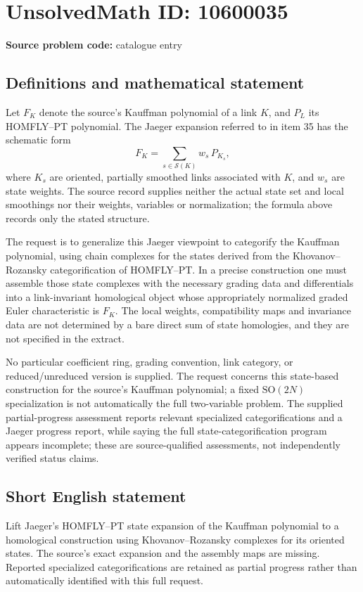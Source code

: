 \documentclass[11pt]{article}
\begin{document}
\section*{UnsolvedMath ID: 10600035}
\textbf{Source problem code:} catalogue entry
\subsection{Definitions and mathematical statement}
Let \(F_K\) denote the source's Kauffman polynomial of a link \(K\), and \(P_L\) its HOMFLY--PT polynomial. The Jaeger expansion referred to in item 35 has the schematic form
\[
 F_K=\sum_{s\in\mathcal S(K)}w_s\,P_{K_s},
\]
where \(K_s\) are oriented, partially smoothed links associated with \(K\), and \(w_s\) are state weights. The source record supplies neither the actual state set and local smoothings nor their weights, variables or normalization; the formula above records only the stated structure.

The request is to generalize this Jaeger viewpoint to categorify the Kauffman polynomial, using chain complexes for the states derived from the Khovanov--Rozansky categorification of HOMFLY--PT. In a precise construction one must assemble those state complexes with the necessary grading data and differentials into a link-invariant homological object whose appropriately normalized graded Euler characteristic is \(F_K\). The local weights, compatibility maps and invariance data are not determined by a bare direct sum of state homologies, and they are not specified in the extract.

No particular coefficient ring, grading convention, link category, or reduced/unreduced version is supplied. The request concerns this state-based construction for the source's Kauffman polynomial; a fixed \(\mathrm{SO}(2N)\) specialization is not automatically the full two-variable problem. The supplied partial-progress assessment reports relevant specialized categorifications and a Jaeger progress report, while saying the full state-categorification program appears incomplete; these are source-qualified assessments, not independently verified status claims.
\subsection{Short English statement}
Lift Jaeger's HOMFLY--PT state expansion of the Kauffman polynomial to a homological construction using Khovanov--Rozansky complexes for its oriented states. The source's exact expansion and the assembly maps are missing. Reported specialized categorifications are retained as partial progress rather than automatically identified with this full request.
\end{document}
